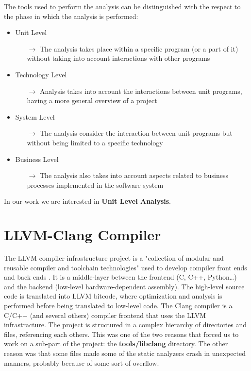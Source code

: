The tools used to perform the analysis can be distinguished with the respect to the phase in which the analysis is performed:

\begin{itemize}
	\item Unit Level
	\begin{itemize}
		\item[$\rightarrow$] The analysis takes place within a specific program (or a part of it) without taking into account interactions with other programs
	\end{itemize}
	\item Technology Level
	\begin{itemize}
		\item[$\rightarrow$] Analysis takes into account the interactions between unit programs, having a more general overview of a project
	\end{itemize}
	\item System Level
	\begin{itemize}
		\item[$\rightarrow$] The analysis consider the interaction between unit programs but without being limited to a specific technology
	\end{itemize}
	\item Business Level
	\begin{itemize}
		\item[$\rightarrow$] The analysis also takes into account aspects related to business processes implemented in the software system
	\end{itemize}
\end{itemize}

In our work we are interested in \textbf{Unit Level Analysis}.
\pagebreak

\section{LLVM-Clang Compiler}

The LLVM compiler infrastructure project is a "collection of modular and reusable compiler and toolchain technologies" used to develop compiler front ends and back ends \cite{bibitem1}. It is a middle-layer between the frontend (C, C++, Python\dots) and the backend (low-level hardware-dependent assembly). The high-level source code is translated into LLVM bitcode, where optimization and analysis is performed before being translated to low-level code.\newline
The Clang compiler is a C/C++ (and several others) compiler frontend that uses the LLVM infrastracture.\newline
The project is structured in a complex hierarchy of directories and files, referencing each others. This was one of the two reasons that forced us to work on a sub-part of the project: the \textbf{tools/libclang} directory. The other reason was that some files made some of the static analyzers crash in unexpected manners, probably because of some sort of overflow.\newline

